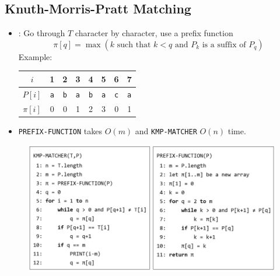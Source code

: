 \documentclass[twocolumn,english]{article}
\providecommand{\tabularnewline}{\\}
\providecommand{\tabularnewline}{\\}
\numberwithin{equation}{section}
\numberwithin{figure}{section}
\numberwithin{table}{section}
\providecommand{\tabularnewline}{\\}
\let\emph\relax
\begin{document}
\subsection{Knuth-Morris-Pratt Matching}
\begin{itemize}
\item \emph{Key Idea}: Go through $T$ character by character, use a prefix
function 
\[
\pi\left[q\right]=\max\left(k\text{ such that }k<q\text{ and }P_{k}\text{ is a suffix of }P_{q}\right)
\]
Example: 
\begin{table}[H]
\centering{}%
\begin{tabular}{cccccccc}
\toprule 
$i$  & 1  & 2  & 3  & 4  & 5  & 6  & 7\tabularnewline
\midrule 
$P\left[i\right]$  & \texttt{a}  & \texttt{b}  & \texttt{a}  & \texttt{b}  & \texttt{a}  & \texttt{c}  & \texttt{a}\tabularnewline
$\pi\left[i\right]$  & 0  & 0  & 1  & 2  & 3  & 0  & 1\tabularnewline
\bottomrule
\end{tabular}
\end{table}

\item \texttt{PREFIX-FUNCTION} takes $O\left(m\right)$ and \texttt{KMP-MATCHER}
$O\left(n\right)$ time. 
\end{itemize}
\begin{figure}[H]
\centering{}\includegraphics[width=0.8\linewidth]{img/kmp-matching} 
\end{figure}
\end{document}
